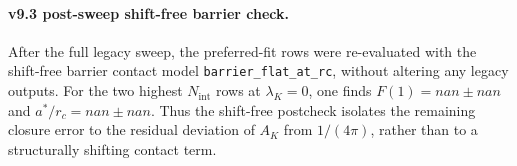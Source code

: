 \paragraph{v9.3 post-sweep shift-free barrier check.}
After the full legacy sweep, the preferred-fit rows were re-evaluated with the shift-free barrier contact model \texttt{barrier\_flat\_at\_rc}, without altering any legacy outputs. For the two highest $N_{\mathrm{int}}$ rows at $\lambda_K=0$, one finds $F(1) = nan \pm nan$ and $a^*/r_c = nan \pm nan$. Thus the shift-free postcheck isolates the remaining closure error to the residual deviation of $A_K$ from $1/(4\pi)$, rather than to a structurally shifting contact term.
